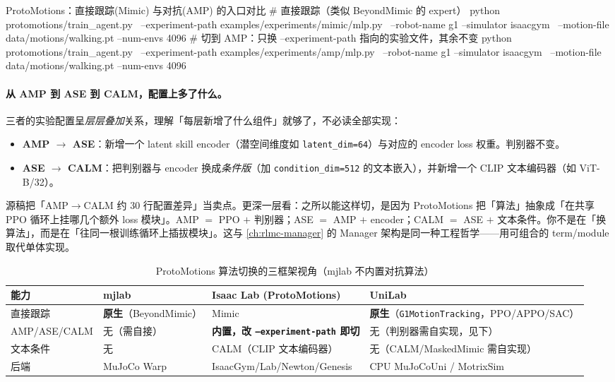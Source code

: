 \begin{codebox}[bash]{ProtoMotions：直接跟踪(Mimic) 与对抗(AMP) 的入口对比}
# 直接跟踪（类似 BeyondMimic 的 expert）
python protomotions/train_agent.py \
    --experiment-path examples/experiments/mimic/mlp.py \
    --robot-name g1 --simulator isaacgym \
    --motion-file data/motions/walking.pt --num-envs 4096
# 切到 AMP：只换 --experiment-path 指向的实验文件，其余不变
python protomotions/train_agent.py \
    --experiment-path examples/experiments/amp/mlp.py \
    --robot-name g1 --simulator isaacgym \
    --motion-file data/motions/walking.pt --num-envs 4096
\end{codebox}

\paragraph{从 AMP 到 ASE 到 CALM，配置上多了什么。}三者的实验配置呈\emph{层层叠加}关系，理解「每层新增了什么组件」就够了，不必读全部实现：

\begin{itemize}
  \item \textbf{AMP $\to$ ASE}：新增一个 latent skill encoder（潜空间维度如 \verb|latent_dim=64|）与对应的 encoder loss 权重。判别器不变。
  \item \textbf{ASE $\to$ CALM}：把判别器与 encoder 换成\emph{条件版}（加 \verb|condition_dim=512| 的文本嵌入），并新增一个 CLIP 文本编码器（如 ViT-B/32）。
\end{itemize}

\begin{insight}[「切算法 = 改实验文件指针」背后的统一抽象]\label{ins:rlmc-mi-switch}
源稿把「AMP$\to$CALM 约 30 行配置差异」当卖点。更深一层看：之所以能这样切，是因为 ProtoMotions 把「算法」抽象成「在共享 PPO 循环上挂哪几个额外 loss 模块」。AMP $=$ PPO $+$ 判别器；ASE $=$ AMP $+$ encoder；CALM $=$ ASE $+$ 文本条件。你不是在「换算法」，而是在「往同一根训练循环上插拔模块」。这与 \cref{ch:rlmc-manager} 的 Manager 架构是同一种工程哲学——用可组合的 term/module 取代单体实现。
\end{insight}

\begin{table}[ht]
\centering
\small
\caption{ProtoMotions 算法切换的三框架视角（mjlab 不内置对抗算法）}
\label{tab:rlmc-mi-switch3}
\begin{tabular}{@{}llll@{}}
\toprule
能力 & mjlab & Isaac Lab (ProtoMotions) & UniLab \\
\midrule
直接跟踪 & \textbf{原生}（BeyondMimic） & Mimic & \textbf{原生}（\verb|G1MotionTracking|，PPO/APPO/SAC） \\
AMP/ASE/CALM & 无（需自接） & \textbf{内置，改 \texttt{--experiment-path} 即切} & 无（判别器需自实现，见下） \\
文本条件 & 无 & CALM（CLIP 文本编码器） & 无（CALM/MaskedMimic 需自实现） \\
后端 & MuJoCo Warp & IsaacGym/Lab/Newton/Genesis & CPU MuJoCoUni / MotrixSim \\
\bottomrule
\end{tabular}
\end{table}

